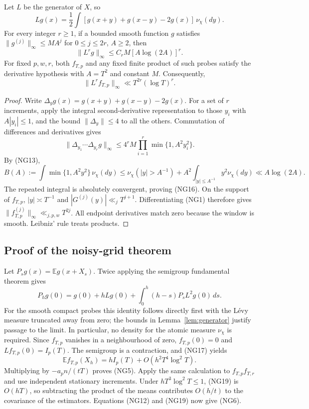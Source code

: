 \begin{lemma}
\label{lem:generator}
Let $L$ be the generator of $X$, so
\[
 Lg(x)=\frac12\int
       [g(x+y)+g(x-y)-2g(x)]\,\nu_\chi(dy).                \tag{NG15}
\]
For every integer $r\ge1$, if a bounded smooth function $g$ satisfies
$\|g^{(j)}\|_\infty\le M A^j$ for $0\le j\le2r$, $A\ge2$, then
\[
 \|L^r g\|_\infty\le C_r M[A\log(2A)]^r.                \tag{NG16}
\]
For fixed $p,w,r$, both $f_{T,p}$ and any fixed finite product of such
probes satisfy the derivative hypothesis with $A=T^2$ and constant $M$.
Consequently,
\[
 \|L^r f_{T,p}\|_\infty\ll T^{2r}(\log T)^r.             \tag{NG17}
\]
\end{lemma}

\begin{proof}
Write $\Delta_y g(x)=g(x+y)+g(x-y)-2g(x)$.  For a set of $r$ increments,
apply the integral second-derivative representation to those $y_i$ with
$A|y_i|\le1$, and the bound $\|\Delta_y\|\le4$ to all the others.
Commutation of differences and derivatives gives
\[
 \|\Delta_{y_1}\cdots\Delta_{y_r}g\|_\infty
 \le4^r M\prod_{i=1}^r\min\{1,A^2y_i^2\}.
\]
By (NG13),
\[
 B(A):=\int\min\{1,A^2y^2\}\,\nu_\chi(dy)
 \le\nu_\chi(|y|>A^{-1})+
      A^2\int_{|y|\le A^{-1}}y^2\nu_\chi(dy)
 \ll A\log(2A).
\]
The repeated integral is absolutely convergent, proving (NG16).
On the support of $f_{T,p}$, $|y|\asymp T^{-1}$ and
$|G^{(j)}(y)|\ll_j T^{j+1}$.  Differentiating (NG1) therefore gives
$\|f_{T,p}^{(j)}\|_\infty\ll_{j,p,w}T^{2j}$.  All endpoint
derivatives match zero because the window is smooth.  Leibniz' rule treats
products.
\end{proof}

\subsection{Proof of the noisy-grid theorem}

Let $P_sg(x)=\mathbb E g(x+X_s)$.  Twice applying the semigroup fundamental
theorem gives
\[
 P_hg(0)=g(0)+hLg(0)+\int_0^h(h-s)P_sL^2g(0)\,ds.       \tag{NG18}
\]
For the smooth compact probes this identity follows directly first with
the L\'evy measure truncated away from zero; the bounds in
Lemma~\ref{lem:generator} justify passage to the limit.  In particular,
no density for the atomic measure $\nu_\chi$ is required.
Since $f_{T,p}$ vanishes in a neighbourhood of zero, $f_{T,p}(0)=0$ and
$Lf_{T,p}(0)=I_p(T)$.  The semigroup is a contraction, and (NG17) yields
\[
 \mathbb E f_{T,p}(X_h)
       =hI_p(T)+O(h^2T^4\log^2T).                        \tag{NG19}
\]
Multiplying by $-a_p n/(tT)$ proves (NG5).  Apply the same calculation to
$f_{T,p}f_{T,r}$ and use independent stationary increments.  Under
$hT^3\log^2T\le1$, (NG19) is $O(hT)$, so subtracting the product of the
means contributes $O(h/t)$ to the covariance of the estimators.
Equations (NG12) and (NG19) now give (NG6).

